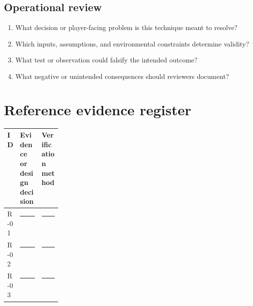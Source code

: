 \documentclass[11pt]{article}
\begin{document}
\subsection{Operational review}
\begin{enumerate}
\item What decision or player-facing problem is this technique meant to resolve?
\item Which inputs, assumptions, and environmental constraints determine validity?
\item What test or observation could falsify the intended outcome?
\item What negative or unintended consequences should reviewers document?
\end{enumerate}

\section{Reference evidence register}
\begin{tabularx}{\linewidth}{@{}p{0.13\linewidth}X X@{}}\toprule ID & Evidence or design decision & Verification method\\\midrule
R-01 & \rule{0.95\linewidth}{0.4pt} & \rule{0.95\linewidth}{0.4pt}\\[0.4cm]
R-02 & \rule{0.95\linewidth}{0.4pt} & \rule{0.95\linewidth}{0.4pt}\\[0.4cm]
R-03 & \rule{0.95\linewidth}{0.4pt} & \rule{0.95\linewidth}{0.4pt}\\\bottomrule\end{tabularx}
\end{document}
